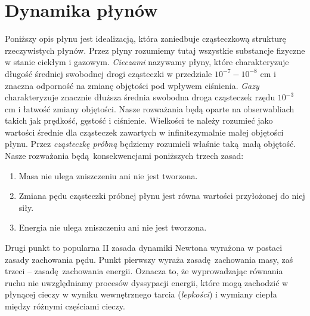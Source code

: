 \section{Dynamika płynów}

Poniższy opis płynu jest idealizacją, która zaniedbuje cząsteczkową strukturę rzeczywistych płynów. Przez płyny rozumiemy tutaj wszystkie substancje fizyczne w stanie ciekłym i gazowym. 
\emph{Cieczami} nazywamy płyny, które charakteryzuje długość średniej swobodnej drogi cząsteczki w przedziale \(10^{-7} - 10^{-8}\) cm i znaczna odporność na zmianę objętości pod wpływem ciśnienia. \emph{Gazy} charakteryzuje znacznie dłuższa średnia swobodna droga cząsteczek rzędu \(10^{-3}\) cm i łatwość zmiany objętości. Nasze rozważania będą oparte na obserwabliach takich jak prędkość, gęstość i ciśnienie. Wielkości te należy rozumieć jako wartości średnie dla cząsteczek zawartych w infinitezymalnie małej objętości płynu. Przez \emph{cząsteczkę próbną} będziemy rozumieli właśnie taką małą objętość. Nasze rozważania będą konsekwencjami poniższych trzech zasad:
\begin{enumerate}
    \item Masa nie ulega zniszczeniu ani nie jest tworzona.
    \item Zmiana pędu cząsteczki próbnej płynu jest równa wartości przyłożonej do niej siły.
    \item Energia nie ulega zniszczeniu ani nie jest tworzona. 
\end{enumerate}
Drugi punkt to popularna II zasada dynamiki Newtona wyrażona w postaci zasady zachowania pędu. Punkt pierwszy wyraża zasadę zachowania masy, zaś trzeci – zasadę zachowania energii. Oznacza to, że wyprowadzając równania ruchu nie uwzględniamy procesów dyssypacji energii, które mogą zachodzić w płynącej cieczy w wyniku wewnętrznego tarcia (\emph{lepkości}) i wymiany ciepła między różnymi częściami cieczy.

